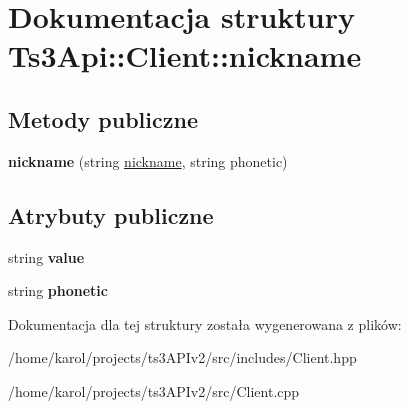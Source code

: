\hypertarget{struct_ts3_api_1_1_client_1_1nickname}{}\section{Dokumentacja struktury Ts3\+Api\+:\+:Client\+:\+:nickname}
\label{struct_ts3_api_1_1_client_1_1nickname}
\subsection*{Metody publiczne}
\begin{DoxyCompactItemize}
\item 
{\bfseries nickname} (string \hyperlink{struct_ts3_api_1_1_client_1_1nickname}{nickname}, string phonetic)\hypertarget{struct_ts3_api_1_1_client_1_1nickname_a1b89520081796e96c17bb041900265bc}{}\label{struct_ts3_api_1_1_client_1_1nickname_a1b89520081796e96c17bb041900265bc}

\end{DoxyCompactItemize}
\subsection*{Atrybuty publiczne}
\begin{DoxyCompactItemize}
\item 
string {\bfseries value}\hypertarget{struct_ts3_api_1_1_client_1_1nickname_a0c0b1bd5e3cfc5eb90d0ba98428ef398}{}\label{struct_ts3_api_1_1_client_1_1nickname_a0c0b1bd5e3cfc5eb90d0ba98428ef398}

\item 
string {\bfseries phonetic}\hypertarget{struct_ts3_api_1_1_client_1_1nickname_aa6e3a9190205ddf1cca72c279376b7c4}{}\label{struct_ts3_api_1_1_client_1_1nickname_aa6e3a9190205ddf1cca72c279376b7c4}

\end{DoxyCompactItemize}


Dokumentacja dla tej struktury została wygenerowana z plików\+:\begin{DoxyCompactItemize}
\item 
/home/karol/projects/ts3\+A\+P\+Iv2/src/includes/Client.\+hpp\item 
/home/karol/projects/ts3\+A\+P\+Iv2/src/Client.\+cpp\end{DoxyCompactItemize}
